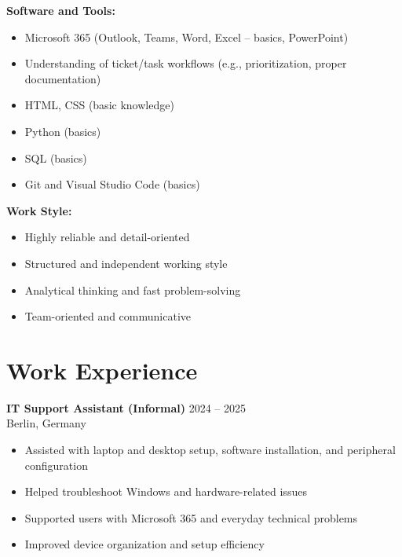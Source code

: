 \textbf{Software and Tools:}
\begin{itemize}
  \item Microsoft 365 (Outlook, Teams, Word, Excel – basics, PowerPoint)
  \item Understanding of ticket/task workflows (e.g., prioritization, proper documentation)
  \item HTML, CSS (basic knowledge)
  \item Python (basics)
  \item SQL (basics)
  \item Git and Visual Studio Code (basics)
  \end{itemize}

\textbf{Work Style:}
\begin{itemize}
  \item Highly reliable and detail-oriented
  \item Structured and independent working style
  \item Analytical thinking and fast problem-solving
  \item Team-oriented and communicative
\end{itemize}

\section*{Work Experience}

\textbf{IT Support Assistant (Informal)} \hfill 2024 -- 2025 \\
Berlin, Germany
\begin{itemize}
    \item Assisted with laptop and desktop setup, software installation, and peripheral configuration
    \item Helped troubleshoot Windows and hardware-related issues
    \item Supported users with Microsoft 365 and everyday technical problems
    \item Improved device organization and setup efficiency
\end{itemize}



